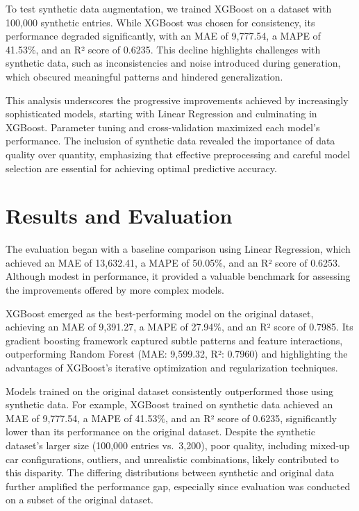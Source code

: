 \documentclass[a4paper,oneside,bibliography=totoc]{scrbook}
\begin{document}
To test synthetic data augmentation, we trained XGBoost on a dataset with 100,000 synthetic entries. While XGBoost was chosen for consistency, its performance degraded significantly, with an MAE of 9,777.54, a MAPE of 41.53\%, and an R² score of 0.6235. This decline highlights challenges with synthetic data, such as inconsistencies and noise introduced during generation, which obscured meaningful patterns and hindered generalization.

This analysis underscores the progressive improvements achieved by increasingly sophisticated models, starting with Linear Regression and culminating in XGBoost. Parameter tuning and cross-validation maximized each model's performance. The inclusion of synthetic data revealed the importance of data quality over quantity, emphasizing that effective preprocessing and careful model selection are essential for achieving optimal predictive accuracy.

\chapter{Results and Evaluation}
\label{cha:resultsAndEvaluation}

The evaluation began with a baseline comparison using Linear Regression, which achieved an MAE of 13,632.41, a MAPE of 50.05\%, and an R² score of 0.6253. Although modest in performance, it provided a valuable benchmark for assessing the improvements offered by more complex models.

XGBoost emerged as the best-performing model on the original dataset, achieving an MAE of 9,391.27, a MAPE of 27.94\%, and an R² score of 0.7985. Its gradient boosting framework captured subtle patterns and feature interactions, outperforming Random Forest (MAE: 9,599.32, R²: 0.7960) and highlighting the advantages of XGBoost's iterative optimization and regularization techniques.

Models trained on the original dataset consistently outperformed those using synthetic data. For example, XGBoost trained on synthetic data achieved an MAE of 9,777.54, a MAPE of 41.53\%, and an R² score of 0.6235, significantly lower than its performance on the original dataset. Despite the synthetic dataset's larger size (100,000 entries vs.~3,200), poor quality, including mixed-up car configurations, outliers, and unrealistic combinations, likely contributed to this disparity. The differing distributions between synthetic and original data further amplified the performance gap, especially since evaluation was conducted on a subset of the original dataset.
\end{document}
